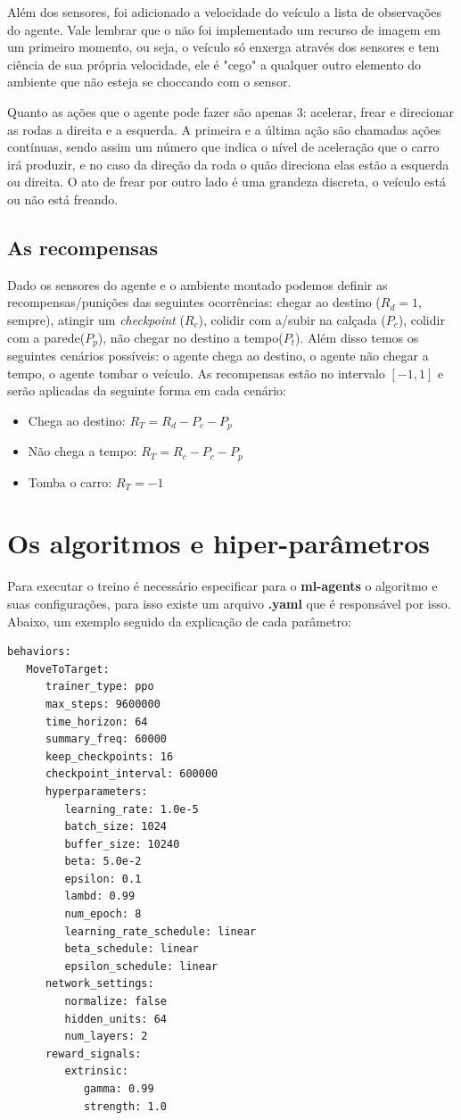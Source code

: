  Além dos sensores, foi adicionado a velocidade do veículo a lista de observações do agente. Vale lembrar que o não foi implementado um recurso de imagem em um primeiro momento, ou seja, o veículo só enxerga através dos sensores e tem ciência de sua própria velocidade, ele é "cego" a qualquer outro elemento do ambiente que não esteja se choccando com o sensor.

 Quanto as ações que o agente pode fazer são apenas 3: acelerar, frear e direcionar as rodas a direita e a esquerda. A primeira e a última ação são chamadas ações contínuas, sendo assim um número que indica o nível de aceleração que o carro irá produzir, e no caso da direção da roda o quão direciona elas estão a esquerda ou direita. O ato de frear por outro lado é uma grandeza discreta, o veículo está ou não está freando.

\subsection{As recompensas}
Dado os sensores do agente e o ambiente montado podemos definir as recompensas/punições das seguintes ocorrências: chegar ao destino ($R_d = 1$, sempre), atingir um \textit{checkpoint} ($R_c$), colidir com a/subir na calçada ($P_c$), colidir com a parede($P_p$), não chegar no destino a tempo($P_t$). Além disso temos os seguintes cenários possíveis: o agente chega ao destino, o agente não chegar a tempo, o agente tombar o veículo. As recompensas estão no intervalo $[-1,1]$ e serão aplicadas da seguinte forma em cada cenário:

\begin{itemize}
   \item Chega ao destino: $R_T = R_d - P_c - P_p$
   \item Não chega a tempo: $R_T = R_c - P_c - P_p$
   \item Tomba o carro: $R_T = -1$
\end{itemize}

\section{Os algoritmos e hiper-parâmetros}\label{algoritmos}
Para executar o treino é necessário especificar para o \textbf{ml-agents} o algoritmo e suas configurações, para isso existe um arquivo \textbf{.yaml} que é responsável por isso. Abaixo, um exemplo seguido da explicação de cada parâmetro:

\begin{lstlisting}
behaviors:
   MoveToTarget:
      trainer_type: ppo
      max_steps: 9600000
      time_horizon: 64
      summary_freq: 60000
      keep_checkpoints: 16     
      checkpoint_interval: 600000
      hyperparameters:
         learning_rate: 1.0e-5
         batch_size: 1024
         buffer_size: 10240
         beta: 5.0e-2
         epsilon: 0.1
         lambd: 0.99
         num_epoch: 8
         learning_rate_schedule: linear
         beta_schedule: linear
         epsilon_schedule: linear
      network_settings:
         normalize: false
         hidden_units: 64
         num_layers: 2
      reward_signals:
         extrinsic:
            gamma: 0.99
            strength: 1.0
\end{lstlisting}

